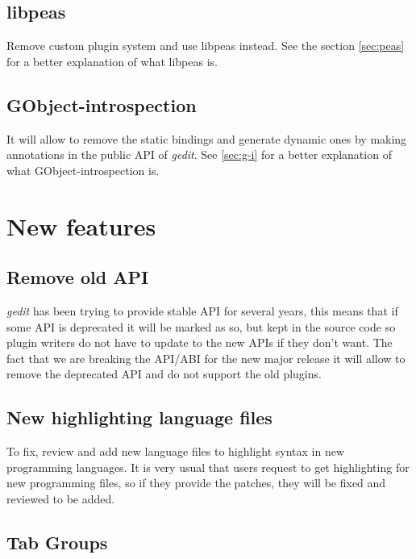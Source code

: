 \subsection{libpeas}\label{sec:libpeas}

Remove custom plugin system and use libpeas instead. See the section \ref{sec:peas} for a better explanation of what libpeas is.

\subsection{GObject-introspection}\label{sec:GObjectIntrospection}

It will allow to remove the static bindings and generate dynamic ones by making annotations in the public API of \emph{gedit}. See \ref{sec:g-i} for a better explanation of what GObject-introspection is.

\section{New features}\label{sec:NewFeatures}

\subsection{Remove old API}\label{sec:RemoveOldAPI}

\emph{gedit} has been trying to provide stable API for several years, this means that if some API is deprecated it will be marked as so, but kept in the source code so plugin writers do not have to update to the new APIs if they don't want. The fact that we are breaking the API/ABI for the new major release it will allow to remove the deprecated API and do not support the old plugins.

\subsection{New highlighting language files}\label{sec:HighFiles}

To fix, review and add new language files to highlight syntax in new programming languages. It is very usual that users request to get highlighting for new programming files, so if they provide the patches, they will be fixed and reviewed to be added.

\subsection{Tab Groups}\label{sec:TabGroups}

